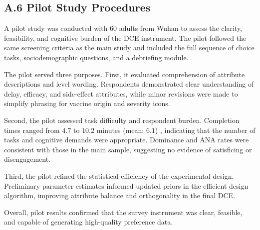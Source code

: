 \subsection*{A.6 Pilot Study Procedures}

A pilot study was conducted with 60 adults from Wuhan to assess the clarity, feasibility, and 
cognitive burden of the DCE instrument. The pilot followed the same screening criteria as the 
main study and included the full sequence of choice tasks, sociodemographic questions, and a 
debriefing module.

The pilot served three purposes. First, it evaluated comprehension of attribute descriptions 
and level wording. Respondents demonstrated clear understanding of delay, efficacy, and 
side-effect attributes, while minor revisions were made to simplify phrasing for vaccine 
origin and severity icons.

Second, the pilot assessed task difficulty and respondent burden. Completion times ranged 
from $4.7$ to $10.2$ minutes (mean: $6.1$)
, indicating that the number of tasks and cognitive 
demands were appropriate. Dominance and ANA rates were consistent with those in the main 
sample, suggesting no evidence of satisficing or disengagement.

Third, the pilot refined the statistical efficiency of the experimental design. Preliminary 
parameter estimates informed updated priors in the efficient design algorithm, improving 
attribute balance and orthogonality in the final DCE.

Overall, pilot results confirmed that the survey instrument was clear, feasible, and capable 
of generating high-quality preference data.
